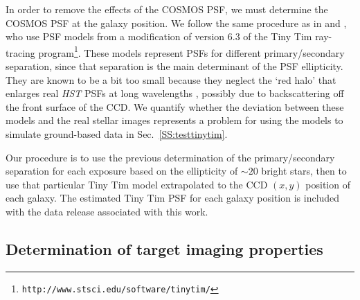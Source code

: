 \documentclass[twocolumn,useAMS,usenatbib]{mn2e}
\newcommand{\newtext}{}
\begin{document}
In order to remove the effects of the COSMOS PSF, we must determine
the COSMOS PSF at the galaxy position.  We follow the same procedure
as in \cite{2007ApJS..172..219L} and \cite{2007MNRAS.376...13M}, who use PSF models
from a modification of version 6.3 of the Tiny Tim ray-tracing
program\footnote{\texttt{http://www.stsci.edu/software/tinytim/}}.
These models represent PSFs for different \newtext{primary/secondary 
separation, since that separation 
is the main determinant of the PSF ellipticity.  
They are known to be a bit too small because they neglect the
`red halo' that enlarges real {\em HST} PSFs at long wavelengths \citep{1998SPIE.3355..608S}, possibly
due to backscattering off the front surface of the CCD. We 
quantify whether the deviation between these models and the real
stellar images represents a problem for using the models to simulate
ground-based data in Sec.~\ref{SS:testtinytim}.}

Our procedure is to use the previous determination
\citep{2007ApJS..172..219L} of the primary/secondary separation for each exposure
based on the ellipticity of $\sim 20$ bright stars, then to use that
particular Tiny Tim model extrapolated to the CCD $(x, y)$ position of
each galaxy.    The estimated Tiny Tim PSF for each galaxy position is
included with the data release associated with this work.



\subsection{Determination of target imaging properties}
\end{document}
